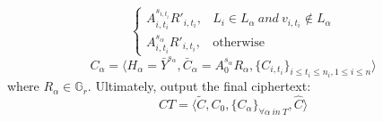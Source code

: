\documentclass[smallextended]{svjour3}       %
\begin{document}
\begin{itemize}
\begin{itemize}
\begin{equation}
\begin{cases}
				A_{i,t_i}^{s_{i,t_i}}R'_{i,t_i}, &\text{$L_i \in L_\alpha \ and \ v_{i,t_i} \notin L_\alpha$}\\
				A_{i,t_i}^{s_{\alpha}}R'_{i,t_i}, &\text{otherwise}
				\end{cases}
			\end{equation}
			\begin{equation}\label{Ca}
				C_\alpha = \langle H_\alpha=\bar{Y}^{s_\alpha}, \bar{C}_\alpha=A_0^{s_\alpha}R_\alpha, \{C_{i,t_i}\}_{i \leq t_i \leq n_i, 1 \leq i \leq n} \rangle
			\end{equation}
			where $R_\alpha \in \mathbb{G}_r$. Ultimately, output the final ciphertext:
			\begin{equation}
				CT=\langle \tilde{C},C_0,\{C_\alpha\}_{\forall \alpha \ in \ T}, \widehat{C} \rangle
			\end{equation}
		\end{itemize}
	
	




\end{itemize}
\end{document}

